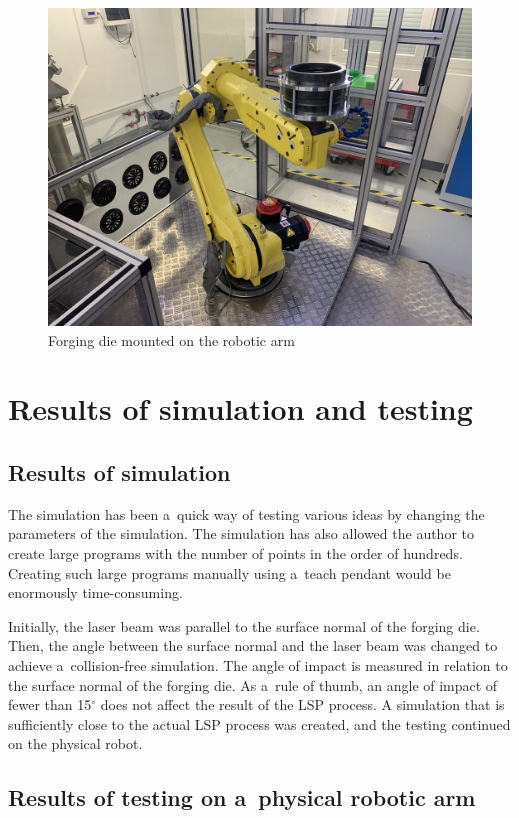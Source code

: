 \begin{figure}[h!]
    \centering
    \includegraphics[width=0.9\linewidth]{img/cast.jpeg}
    \caption{Forging die mounted on the robotic arm}
    \label{fig:cast}
\end{figure}

\section{Results of simulation and testing}

\subsection{Results of simulation}

The simulation has been a~quick way of testing various ideas by changing the parameters of the simulation. The simulation has also allowed the author to create large programs with the number of points in the order of hundreds. Creating such large programs manually using a~teach pendant would be enormously time-consuming. 

Initially, the laser beam was parallel to the surface normal of the forging die. Then, the angle between the surface normal and the laser beam was changed to achieve a~collision-free simulation. The angle of impact is measured in relation to the surface normal of the forging die. As a~rule of thumb, an angle of impact of fewer than 15$^{\circ}$ does not affect the result of the LSP process.  A simulation that is sufficiently close to the actual LSP process was created, and the testing continued on the physical robot.

\subsection{Results of testing on a~physical robotic arm}

